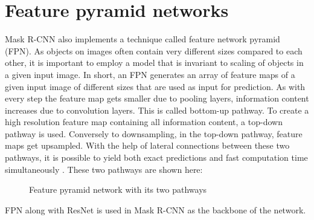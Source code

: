 \section{Feature pyramid networks}
\label{fpn}

Mask R-CNN also implements a technique called feature network pyramid (FPN). As objects on images often contain very different sizes compared to each other, it is important to employ a model that is invariant to scaling of objects in a given input image. In short, an FPN generates an array of feature maps of a given input image of different sizes that are used as input for prediction. As with every step the feature map gets smaller due to pooling layers, information content increases due to convolution layers. This is called bottom-up pathway. To create a high resolution feature map containing all information content, a top-down pathway is used. Conversely to downsampling, in the top-down pathway, feature maps get upsampled. With the help of lateral connections between these two pathways, it is possible to yield both exact predictions and fast computation time simultaneously \cite{FPN}. These two pathways are shown here:

\begin{figure}[H]
	\caption{\label{fig:fpn} Feature pyramid network with its two pathways}
\end{figure}

FPN along with ResNet is used in Mask R-CNN as the backbone of the network.

